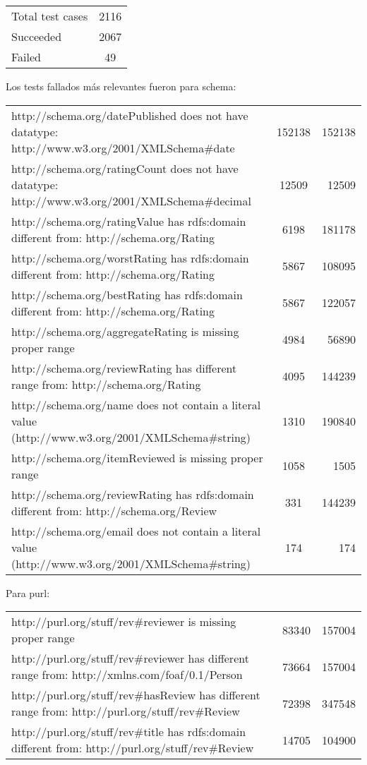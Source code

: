 \begin{tabular}{| l | c | }
Total test cases & 2116\\
Succeeded & 2067\\
Failed & 49\\
\end{tabular}

Los tests fallados más relevantes fueron para schema:

\begin{tabular}{| l | c | r | }
http://schema.org/datePublished does not have datatype: http://www.w3.org/2001/XMLSchema\#date & 152138 & 152138\\
http://schema.org/ratingCount does not have datatype: http://www.w3.org/2001/XMLSchema\#decimal & 12509 & 12509\\
http://schema.org/ratingValue has rdfs:domain different from: http://schema.org/Rating & 6198	 & 181178\\
http://schema.org/worstRating has rdfs:domain different from: http://schema.org/Rating & 5867 & 108095\\
http://schema.org/bestRating has rdfs:domain different from: http://schema.org/Rating & 5867 & 122057\\
http://schema.org/aggregateRating is missing proper range & 4984 & 56890\\
http://schema.org/reviewRating has different range from: http://schema.org/Rating & 4095 & 144239\\
http://schema.org/name does not contain a literal value (http://www.w3.org/2001/XMLSchema\#string) & 1310 & 190840\\
http://schema.org/itemReviewed is missing proper range & 1058 & 1505\\
http://schema.org/reviewRating has rdfs:domain different from: http://schema.org/Review & 331	 & 144239\\
http://schema.org/email does not contain a literal value (http://www.w3.org/2001/XMLSchema\#string) & 174 & 174\\
\end{tabular}

Para purl:

\begin{tabular}{| l | c | r | }
http://purl.org/stuff/rev\#reviewer is missing proper range & 83340 & 157004\\
http://purl.org/stuff/rev\#reviewer has different range from: http://xmlns.com/foaf/0.1/Person	 & 73664 & 157004\\
http://purl.org/stuff/rev\#hasReview has different range from: http://purl.org/stuff/rev\#Review & 72398 & 347548\\
http://purl.org/stuff/rev\#title has rdfs:domain different from: http://purl.org/stuff/rev\#Review & 14705 & 104900\\
\end{tabular}

